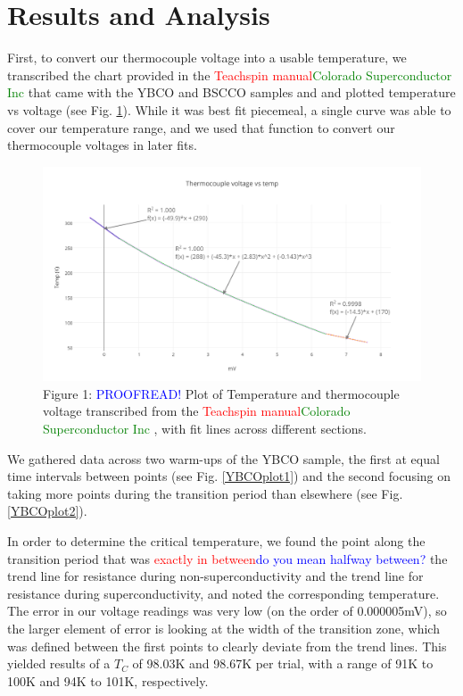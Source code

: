 \documentclass[prb,preprint]{revtex4-1}
\begin{document}
\section{Results and Analysis}

First, to convert our thermocouple voltage into a usable temperature, we transcribed the chart provided in the \textcolor{red}{Teachspin manual}\textcolor{green}{Colorado Superconductor Inc} that came with the YBCO and BSCCO samples and and plotted temperature vs voltage (see Fig. \ref{TCplot}). While it was best fit piecemeal, a single curve was able to cover our temperature range, and we used that function to convert our thermocouple voltages in later fits.

\begin{figure}[h!]
\centering
\includegraphics[width=7in]{thermocouple_voltage_vs_temp.png}
\caption{Figure 1: \textcolor{blue}{PROOFREAD!} Plot of Temperature and thermocouple voltage transcribed from the \textcolor{red}{Teachspin manual}\textcolor{green}{Colorado Superconductor Inc} , with fit lines across different sections.}
\label{TCplot}
\end{figure}

We gathered data across two warm-ups of the YBCO sample, the first at equal time intervals between points (see Fig. \ref{YBCOplot1}) and the second focusing on taking more points during the transition period than elsewhere (see Fig. \ref{YBCOplot2}). 

In order to determine the critical temperature, we found the point along the transition period that was \textcolor{red}{exactly in between}\textcolor{blue}{do you mean halfway between?} the trend line for resistance during non-superconductivity and the trend line for resistance during superconductivity, and noted the corresponding temperature. The error in our voltage readings was very low (on the order of 0.000005mV), so the larger element of error is looking at the width of the transition zone, which was defined between the first points to clearly deviate from the trend lines. This yielded results of a $T_C$ of 98.03K and 98.67K per trial, with a range of 91K to 100K and 94K to 101K, respectively.
\end{document}
